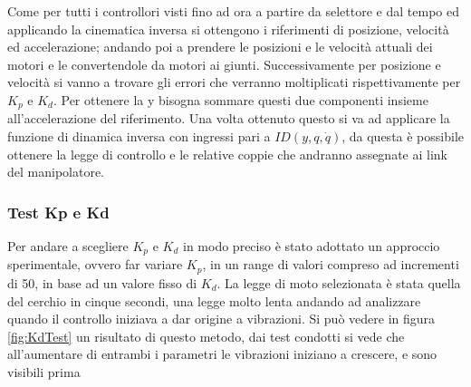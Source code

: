 Come per tutti i controllori visti fino ad ora a partire da selettore e dal tempo ed applicando la cinematica inversa  si ottengono i riferimenti di posizione,  velocità ed accelerazione; andando poi a prendere le posizioni e le velocità attuali dei motori e le convertendole da motori ai giunti. Successivamente per posizione e velocità si vanno a trovare gli errori che verranno moltiplicati rispettivamente per $K_p$ e $K_d$. Per ottenere la y bisogna sommare questi due componenti insieme all'accelerazione del riferimento. Una volta ottenuto questo si va ad applicare la funzione di dinamica inversa con ingressi pari a $ID(y,q,\dot{q})$, da questa è possibile ottenere la legge di controllo e le relative coppie che andranno assegnate ai link del manipolatore. 
\subsubsection*{Test Kp e Kd}
Per andare a scegliere $K_p$ e $K_d$ in modo preciso è stato adottato un approccio sperimentale, ovvero far variare $K_p$, in un range di valori compreso ad incrementi di 50, in base ad un valore fisso di $K_d$. La legge di moto selezionata è stata quella del cerchio in cinque secondi, una legge molto lenta andando ad analizzare quando il controllo iniziava a dar origine a vibrazioni. Si può vedere in figura \ref{fig:KdTest} un risultato di questo metodo, dai test condotti si vede che all'aumentare di entrambi i parametri le vibrazioni iniziano a crescere, e sono visibili prima  
